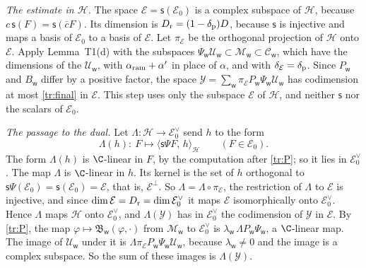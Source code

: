 \documentclass[11pt,letterpaper]{article}
\begin{document}
\emph{The estimate in $\mathcal H$.} The space $\mathcal E=\mathsf s(\mathcal E_0)$ is a complex subspace of
$\mathcal H$, because $c\,\mathsf s(F)=\mathsf s(\bar cF)$. Its dimension is $D_{\rm r}=(1-\delta_{\rm p})D$,
because $\mathsf s$ is injective and maps a basis of $\mathcal E_0$ to a basis of $\mathcal E$. Let $\pi_{\mathcal E}$ be
the orthogonal projection of $\mathcal H$ onto $\mathcal E$. Apply Lemma~T1(d) with the subspaces
$\Psi_{\mathsf w}\mathcal U_{\mathsf w}\subset\mathcal M_{\mathsf w}\subset\mathcal C_{\mathsf w}$, which have the
dimensions of the $\mathcal U_{\mathsf w}$, with $\alpha_{\rm ram}+\alpha'$ in place of $\alpha$, and with
$\delta_{\mathcal E}=\delta_{\rm p}$. Since $P_{\mathsf w}$ and $B_{\mathsf w}$ differ by a positive factor, the
space $\mathcal Y=\sum_{\mathsf w}\pi_{\mathcal E} P_{\mathsf w}\Psi_{\mathsf w}\mathcal U_{\mathsf w}$ has codimension at most
\eqref{tr:final} in $\mathcal E$. This step uses only the subspace $\mathcal E$ of $\mathcal H$, and neither
$\mathsf s$ nor the scalars of $\mathcal E_0$.

\emph{The passage to the dual.} Let $\Lambda:\mathcal H\to\mathcal E_0^\vee$ send $h$ to the form
\begin{equation}\label{D:314}
 \Lambda(h):\ F\longmapsto\langle\mathsf s\Psi F,\,h\rangle_{\mathcal H}\qquad(F\in\mathcal E_0).
\end{equation}
The form $\Lambda(h)$ is $\C$-linear in $F$, by the computation after \eqref{tr:P}; so it lies in
$\mathcal E_0^\vee$. The map $\Lambda$ is $\C$-linear in $h$. Its kernel is the set of $h$ orthogonal to
$\mathsf s\Psi(\mathcal E_0)=\mathsf s(\mathcal E_0)=\mathcal E$, that is, $\mathcal E^\perp$. So
$\Lambda=\Lambda\circ\pi_{\mathcal E}$, the restriction of $\Lambda$ to $\mathcal E$ is injective, and since
$\dim\mathcal E=D_{\rm r}=\dim\mathcal E_0^\vee$ it maps $\mathcal E$ isomorphically onto $\mathcal E_0^\vee$.
Hence $\Lambda$ maps $\mathcal H$ onto $\mathcal E_0^\vee$, and $\Lambda(\mathcal Y)$ has in $\mathcal E_0^\vee$
the codimension of $\mathcal Y$ in $\mathcal E$. By \eqref{tr:P}, the map
$\varphi\mapsto\mathfrak B_{\mathsf w}(\varphi,\cdot)$ from $\mathcal M_{\mathsf w}$ to $\mathcal E_0^\vee$ is
$\lambda_{\mathsf w}\,\Lambda P_{\mathsf w}\Psi_{\mathsf w}$, a $\C$-linear map. The image of $\mathcal U_{\mathsf w}$
under it is $\Lambda\pi_{\mathcal E} P_{\mathsf w}\Psi_{\mathsf w}\mathcal U_{\mathsf w}$, because $\lambda_{\mathsf w}\ne0$ and the
image is a complex subspace. So the sum of these images is $\Lambda(\mathcal Y)$.
\end{document}
